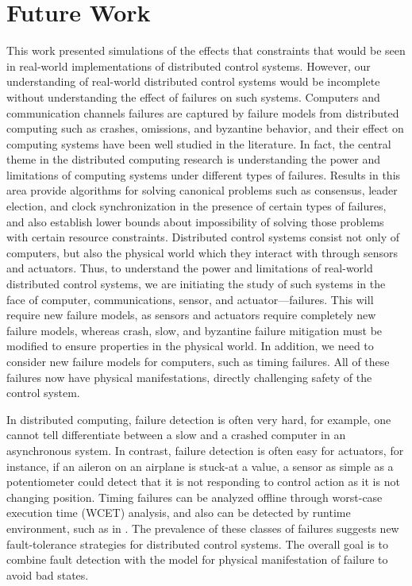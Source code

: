 \documentclass[10pt, conference, compsocconf]{IEEEtran}
\begin{document}
\section{Future Work}
\label{sec:future}
This work presented simulations of the effects that constraints that would be seen in real-world implementations of distributed control systems.
%
However, our understanding of real-world distributed control systems would be incomplete without understanding the effect of failures on such systems.
%
Computers and communication channels failures are captured by failure models from distributed computing such as crashes, omissions, and byzantine behavior, and their effect on computing systems have been well studied in the literature. 
%
In fact, the central theme in the distributed computing research is understanding the power and limitations of computing systems under different types of failures. 
%
Results in this area provide algorithms for solving canonical problems such as consensus, leader election, and clock synchronization in the presence of certain types of failures, and also establish lower bounds about impossibility of solving those problems with certain resource constraints.
%
Distributed control systems consist not only of computers, but also the physical world which they interact with through sensors and actuators. 
%
Thus, to understand the power and limitations of real-world distributed control systems, we are initiating the study of such systems in the face of computer, communications, sensor, and actuator---failures. 
%
This will require new failure models, as sensors and actuators require completely new failure models, whereas crash, slow, and byzantine failure mitigation must be modified to ensure properties in the physical world.
%
In addition, we need to consider new failure models for computers, such as timing failures. 
%
All of these failures now have physical manifestations, directly challenging safety of the control system.

In distributed computing, failure detection is often very hard, for example, one cannot tell differentiate between a slow and a crashed computer in an asynchronous system.
%
In contrast, failure detection is often easy for actuators, for instance, if an aileron on an airplane is stuck-at a value, a sensor as simple as a potentiometer could detect that it is not responding to control action as it is not changing position.
%
Timing failures can be analyzed offline through worst-case execution time (WCET) analysis, and also can be detected by runtime environment, such as in \cite{HenzingerGiotto2001}.
%
The prevalence of these classes of failures suggests new fault-tolerance strategies for distributed control systems.
%
The overall goal is to combine fault detection with the model for physical manifestation of failure to avoid bad states.
\end{document}
